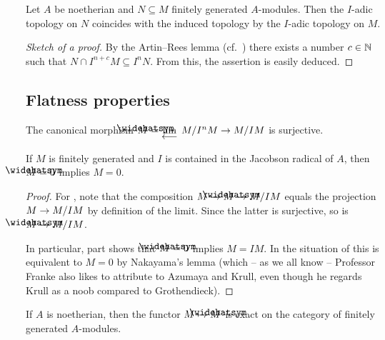 \documentclass[a4paper,parskip=half,numbers=enddot, DIV=12]{scrreprt}
\begin{document}
\begin{prop}
	Let $A$ be noetherian and $N\subseteq M$ finitely generated $A$-modules. Then the $I$-adic topology on $N$ coincides with the induced topology by the $I$-adic topology on $M$.
\end{prop}
\begin{proof}[Sketch of a proof]
	By the Artin--Rees lemma (cf.\ \cite[Proposition~3.4.1]{alg2}) there exists a number $c\in\mathbb{N}$ such that $N\cap I^{n+c}M\subseteq I^nN$. From this, the assertion is easily deduced.
\end{proof}
\subsection{Flatness properties}
\begin{fact}
	\begin{alphanumerate}
		\item {}The canonical morphism $\roof{M}=\limit M/I^nM\morphism M/IM$ is surjective.
		\item If $M$ is finitely generated and $I$ is contained in the Jacobson radical of $A$, then $\roof{M}=0$ implies $M=0$.
	\end{alphanumerate}
\end{fact}
\begin{proof}
	For , note that the composition $M\morphism\roof{M}\morphism M/IM$ equals the projection $M\morphism M/IM$ by definition of the limit. Since the latter is surjective, so is $\roof{M}\morphism M/IM$. 
	
	In particular, part  shows that $\roof{M}=0$ implies $M=IM$. In the situation of  this is equivalent to $M=0$ by Nakayama's lemma (which -- as we all know -- Professor Franke also likes to attribute to Azumaya and Krull, even though he regards Krull as a noob compared to Grothendieck).
\end{proof}
\begin{cor}
	If $A$ is noetherian, then the functor $M\mapsto \roof{M}$ is exact on the category of finitely generated $A$-modules.
\end{cor}
\end{document}
